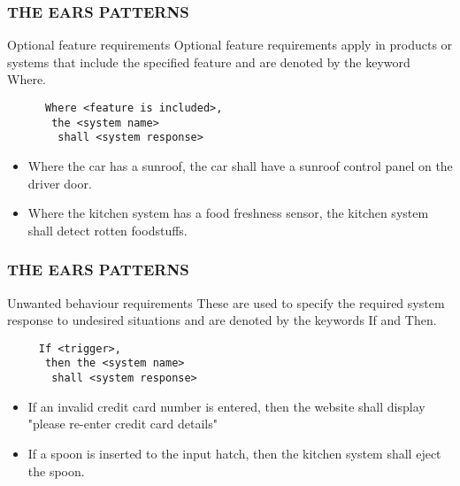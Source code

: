 \documentclass[aspectratio=169]{beamer}
\begin{document}
\begin{frame}[fragile]
  \frametitle{THE EARS PATTERNS}
  \begin{block}{Optional feature requirements}
  Optional feature requirements apply in products or systems that include the specified feature and are denoted by the keyword Where.
    \begin{verbatim}
      Where <feature is included>, 
       the <system name> 
        shall <system response>
    \end{verbatim}
  \end{block}
  
  \begin{example}
  \begin{itemize}
    \item Where the car has a sunroof, the car shall have a sunroof control panel on the driver door.
    \item Where the kitchen system has a food freshness sensor, the kitchen system shall detect rotten foodstuffs. 
  \end{itemize}
  \end{example}
\end{frame}



\begin{frame}[fragile]
  \frametitle{THE EARS PATTERNS}
  \begin{block}{Unwanted behaviour requirements}
    These are used to specify the required system response to undesired situations and are denoted by the keywords If and Then.
    \begin{verbatim}
     If <trigger>, 
      then the <system name> 
       shall <system response> 
    \end{verbatim}
      \end{block}
  
  \begin{example}
  \begin{itemize}
    \item If an invalid credit card number is entered, then the website shall display "please re-enter credit card details"
    \item  If a spoon is inserted to the input hatch, then the kitchen system shall eject the spoon.
  \end{itemize}
  \end{example}
\end{frame}
\end{document}
